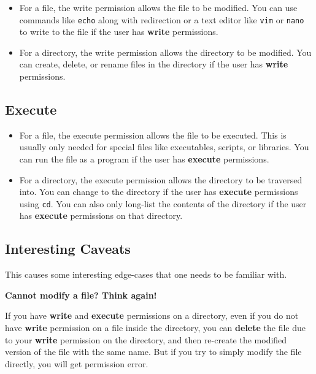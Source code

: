 \begin{itemize}
  \item For a file, the write permission allows the file to be modified.
    You can use commands like \texttt{echo} along with redirection
    or a text editor like \texttt{vim} or \texttt{nano}
      to write to the file if the user has \textbf{write} permissions.
  \item For a directory, the write permission allows the directory to be modified.
    You can create, delete, or rename files in the directory if the user has \textbf{write} permissions.
\end{itemize}

\subsection{Execute}

\begin{itemize}
  \item For a file, the execute permission allows the file to be executed.
    This is usually only needed for special files like executables,
    scripts, or libraries.
    You can run the file as a program if the user has \textbf{execute} permissions.
  \item For a directory, the execute permission allows the directory to be traversed into.
    You can change to the directory if the user has \textbf{execute} permissions using \texttt{cd}.
    You can also only long-list the contents of the directory if the user has \textbf{execute} permissions on that directory.
\end{itemize}

\subsection{Interesting Caveats}

This causes some interesting edge-cases that one needs to be familiar with.

\textbf{Cannot modify a file? Think again!}

If you have \textbf{write} and \textbf{execute} permissions on a directory, even if you do not have \textbf{write} permission on a file inside the directory, you can \textbf{delete} the file due to your \textbf{write} permission on the directory, and then re-create the modified version of the file with the same name.
But if you try to simply modify the file directly, you will get permission error.

